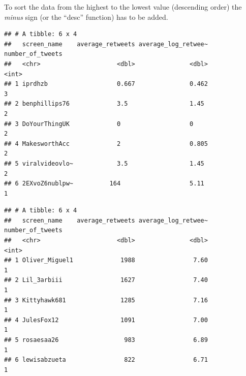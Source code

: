 \documentclass[
]{article}
\newenvironment{Shaded}{\begin{snugshade}}{\end{snugshade}}
\newcommand{\KeywordTok}[1]{\textcolor[rgb]{0.13,0.29,0.53}{\textbf{#1}}}
\newcommand{\NormalTok}[1]{#1}
\newcommand{\OperatorTok}[1]{\textcolor[rgb]{0.81,0.36,0.00}{\textbf{#1}}}
\newcommand{\StringTok}[1]{\textcolor[rgb]{0.31,0.60,0.02}{#1}}
\begin{document}
To sort the data from the highest to the lowest value (descending order) the \emph{minus} sign (or the ``desc'' function) has to be added.

\begin{Shaded}
\end{Shaded}

\begin{verbatim}
## # A tibble: 6 x 4
##   screen_name    average_retweets average_log_retwee~ number_of_tweets
##   <chr>                     <dbl>               <dbl>            <int>
## 1 iprdhzb                   0.667               0.462                3
## 2 benphillips76             3.5                 1.45                 2
## 3 DoYourThingUK             0                   0                    2
## 4 MakesworthAcc             2                   0.805                2
## 5 viralvideovlo~            3.5                 1.45                 2
## 6 2EXvoZ6nublpw~          164                   5.11                 1
\end{verbatim}

\begin{Shaded}
\end{Shaded}

\begin{verbatim}
## # A tibble: 6 x 4
##   screen_name    average_retweets average_log_retwee~ number_of_tweets
##   <chr>                     <dbl>               <dbl>            <int>
## 1 Oliver_Miguel1             1988                7.60                1
## 2 Lil_3arbiii                1627                7.40                1
## 3 Kittyhawk681               1285                7.16                1
## 4 JulesFox12                 1091                7.00                1
## 5 rosaesaa26                  983                6.89                1
## 6 lewisabzueta                822                6.71                1
\end{verbatim}
\end{document}
